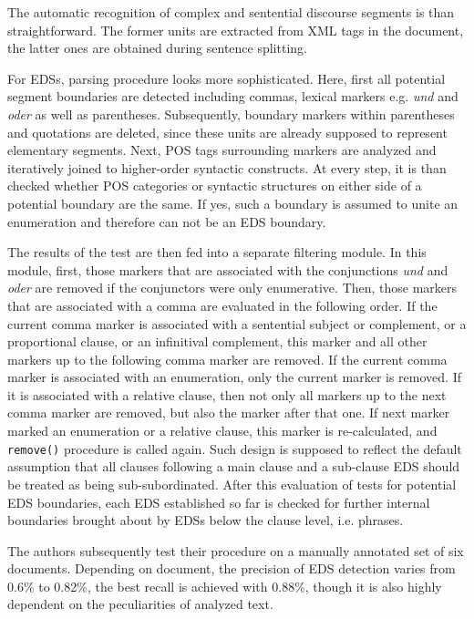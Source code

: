 \documentclass[a4paper,11pt]{article}
\begin{document}
The automatic recognition of complex and sentential discourse segments is than
straightforward.  The former units are extracted from XML tags in the
document, the latter ones are obtained during sentence splitting.

For EDSs, parsing procedure looks more sophisticated.  Here, first all
potential segment boundaries are detected including commas, lexical
markers e.g. \textit{und} and \textit{oder} as well as parentheses.
Subsequently, boundary markers within parentheses and quotations are
deleted, since these units are already supposed to represent
elementary segments.  Next, POS tags surrounding markers are analyzed
and iteratively joined to higher-order syntactic constructs.  At every
step, it is than checked whether POS categories or syntactic
structures on either side of a potential boundary are the same.  If
yes, such a boundary is assumed to unite an enumeration and therefore
can not be an EDS boundary.

The results of the test are then fed into a separate filtering module.  In
this module, first, those markers that are associated with the conjunctions
\textit{und} and \textit{oder} are removed if the conjunctors were only
enumerative.  Then, those markers that are associated with a comma are
evaluated in the following order.  If the current comma marker is associated
with a sentential subject or complement, or a proportional clause, or an
infinitival complement, this marker and all other markers up to the following
comma marker are removed.  If the current comma marker is associated with an
enumeration, only the current marker is removed.  If it is associated with a
relative clause, then not only all markers up to the next comma marker are
removed, but also the marker after that one.  If next marker marked an
enumeration or a relative clause, this marker is re-calculated, and
\texttt{remove()} procedure is called again.  Such design is supposed to
reflect the default assumption that all clauses following a main clause and a
sub-clause EDS should be treated as being sub-subordinated.  After this
evaluation of tests for potential EDS boundaries, each EDS established so far
is checked for further internal boundaries brought about by EDSs below the
clause level, i.e. phrases.

The authors subsequently test their procedure on a manually annotated set of
six documents.  Depending on document, the precision of EDS detection varies
from 0.6\% to 0.82\%, the best recall is achieved with 0.88\%, though it is
also highly dependent on the peculiarities of analyzed text.


\end{document}

